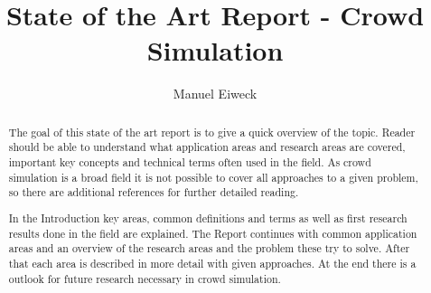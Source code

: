 \documentclass[sigconf]{acmart}
\begin{document}
\title{State of the Art Report - Crowd Simulation}

\author{Manuel Eiweck}


\renewcommand{\shortauthors}{Trovato and Tobin, et al.}

\begin{abstract}
The goal of this state of the art report is to give a quick overview of the topic. Reader should be able to understand what application areas and research areas are covered, important key concepts and technical terms often used in the field. As crowd simulation is a broad field it is not possible to cover all approaches to a given problem, so there are additional references for further detailed reading. 

In the Introduction key areas, common definitions and terms as well as first research results done in the field are explained. The Report continues with common application areas and an overview of the research areas and the problem these try to solve. After that each area is described in more detail with given approaches. At the end there is a outlook for future research necessary in crowd simulation. 
\end{abstract}
\end{document}
